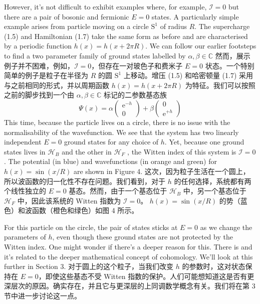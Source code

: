 \documentclass{article}
\newcommand{\rme}{\mathrm{e}}
\begin{document}
However, it's not diﬃcult to exhibit examples where, for example, $\mathcal{I} = 0$ but there are a pair of bosonic and fermionic $E = 0$ states. A particularly simple example arises from particle moving on a circle $\mathrm{S}^1$ of radius $R$. The supercharge (1.5) and Hamiltonian (1.7) take the same form as before and are characterised by a periodic function $h(x) = h(x + 2 \pi R)$. We can follow our earlier footsteps to find a two parameter family of ground states labelled by $\alpha, \beta \in \mathbb{C}$
然而，展示例子并不困难，例如，$\mathcal{I} = 0$，但存在一对玻色子和费米子 $E = 0$ 状态。一个特别简单的例子是粒子在半径为 $R$ 的圆 $\mathrm{S}^1$ 上移动。增压 (1.5) 和哈密顿量 (1.7) 采用与之前相同的形式，并以周期函数 $h(x) = h(x + 2 \pi R)$ 为特征。我们可以按照之前的脚步找到一个由 $\alpha, \beta \in \mathbb{C}$ 标记的二参数基态族
\[ \Psi(x) = \alpha \begin{pmatrix}
        \rme^{- h} \\ 0
    \end{pmatrix} + \beta \begin{pmatrix}
        0 \\ \rme^{+ h}
    \end{pmatrix} \]
This time, because the particle lives on a circle, there is no issue with the normalisability of the wavefunction. We see that the system has two linearly independent $E = 0$ ground states for any choice of $h$. Yet, because one ground states lives in $\mathcal{H}_B$ and the other in $\mathcal{H}_F$ , the Witten index of this system is $\mathcal{I} = 0$. The potential (in blue) and wavefunctions (in orange and green) for $h(x) = \sin(x / R)$ are shown in Figure 4.
这次，因为粒子生活在一个圆上，所以波函数的归一化性不存在问题。我们看到，对于 $h$ 的任何选择，系统都有两个线性独立的 $E = 0$ 基态。然而，由于一个基态位于 $\mathcal{H}_B$ 中，另一个基态位于 $\mathcal{H}_F$ 中，因此该系统的 Witten 指数为 $\mathcal{I} = 0$。 $h(x) = \sin(x / R)$ 的势（蓝色）和波函数（橙色和绿色）如图 4 所示。

For this particle on the circle, the pair of states sticks at $E = 0$ as we change the parameters of $h$, even though these ground states are not protected by the Witten index. One might wonder if there's a deeper reason for this. There is and it's related to the deeper mathematical concept of cohomology. We'll look at this further in Section 3.
对于圆上的这个粒子，当我们改变 $h$ 的参数时，这对状态保持在 $E = 0$，即使这些基态不受 Witten 指数的保护。人们可能想知道这是否有更深层次的原因。确实存在，并且它与更深层的上同调数学概念有关。我们将在第 3 节中进一步讨论这一点。
\end{document}
